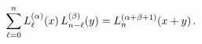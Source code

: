 \[\sum_{\ell=0}^{n}\mathop{L^{(\alpha)}_{\ell}\/}\nolimits\!\left(x\right)%
\mathop{L^{(\beta)}_{n-\ell}\/}\nolimits\!\left(y\right)=\mathop{L^{(\alpha+%
\beta+1)}_{n}\/}\nolimits\!\left(x+y\right).\]